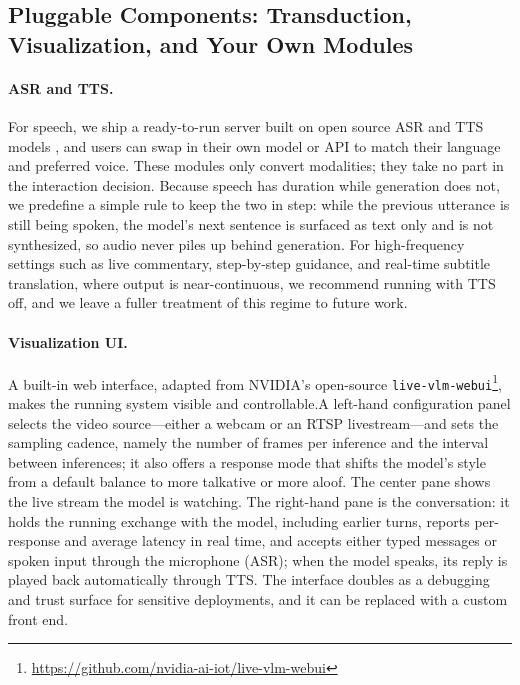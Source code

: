 \subsection{Pluggable Components: Transduction, Visualization, and Your Own Modules}\label{sec:sys-plug}
\paragraph{\textbf{ASR and TTS.}} For speech, we ship a ready-to-run server built on open source ASR \cite{gao2023funasr} and TTS models \cite{du2025cosyvoice}, and users can swap in their own model or API to match their language and preferred voice. These modules only convert modalities; they take no part in the interaction decision. Because speech has duration while generation does not, we predefine a simple rule to keep the two in step: while the previous utterance is still being spoken, the model's next sentence is surfaced as text only and is not synthesized, so audio never piles up behind generation. For high-frequency settings such as live commentary, step-by-step guidance, and real-time subtitle translation, where output is near-continuous, we recommend running with TTS off, and we leave a fuller treatment of this regime to future work.

\paragraph{\textbf{Visualization UI.}} A built-in web interface, adapted from NVIDIA's open-source \texttt{live-vlm-webui}\footnote{\url{https://github.com/nvidia-ai-iot/live-vlm-webui}}, makes the running system visible and controllable.A left-hand configuration panel selects the video source—either a webcam or an RTSP livestream—and sets the sampling cadence, namely the number of frames per inference and the interval between inferences; it also offers a response mode that shifts the model's style from a default balance to more talkative or more aloof. The center pane shows the live stream the model is watching. The right-hand pane is the conversation: it holds the running exchange with the model, including earlier turns, reports per-response and average latency in real time, and accepts either typed messages or spoken input through the microphone (ASR); when the model speaks, its reply is played back automatically through TTS. The interface doubles as a debugging and trust surface for sensitive deployments, and it can be replaced with a custom front end.

